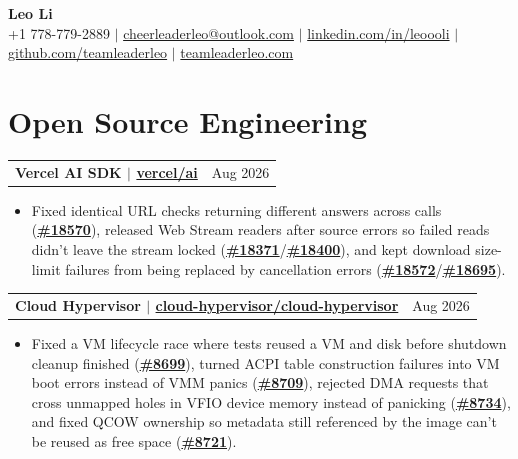 \documentclass[letterpaper,11pt]{article}
\makeatletter
\newcommand{\resumeHeadingSimple}[2]{%
  \begin{tabularx}{\textwidth}{@{}Xr@{}}
    \textbf{#1} & #2
  \end{tabularx}\vspace{-0.25pt}
}
\newcommand{\resumeItemListStart}{\begin{itemize}[leftmargin=0.23in,itemsep=1.2pt,parsep=0pt,topsep=1.0pt]}
\newcommand{\resumeItem}[1]{\item\fontsize{10.6pt}{12.2pt}\selectfont #1}
\newcommand{\resumeItemListEnd}{\end{itemize}\vspace{-0.25pt}}
\makeatother
\begin{document}
\begin{center}
  {\Huge\textbf{Leo Li}} \\[2pt]
  \small
  +1 778-779-2889 $|$
  \href{mailto:cheerleaderleo@outlook.com}{cheerleaderleo@outlook.com} $|$
  \href{https://www.linkedin.com/in/leoooli/}{linkedin.com/in/leoooli} $|$
  \href{https://github.com/teamleaderleo}{github.com/teamleaderleo} $|$
  \href{https://teamleaderleo.com/}{teamleaderleo.com}
\end{center}
\vspace{-10pt}

\section{Open Source Engineering}

\resumeHeadingSimple
  {Vercel AI SDK $|$ \href{https://redirect.github.com/vercel/ai}{vercel/ai}}
  {Aug 2026}
\resumeItemListStart
  \resumeItem{Fixed identical URL checks returning different answers across calls (\href{https://redirect.github.com/vercel/ai/pull/18570}{\textbf{\#18570}}), released Web Stream readers after source errors so failed reads didn't leave the stream locked (\href{https://redirect.github.com/vercel/ai/pull/18371}{\textbf{\#18371}}/\href{https://redirect.github.com/vercel/ai/pull/18400}{\textbf{\#18400}}), and kept download size-limit failures from being replaced by cancellation errors (\href{https://redirect.github.com/vercel/ai/pull/18572}{\textbf{\#18572}}/\href{https://redirect.github.com/vercel/ai/pull/18695}{\textbf{\#18695}}).}
\resumeItemListEnd

\resumeHeadingSimple
  {Cloud Hypervisor $|$ \href{https://redirect.github.com/cloud-hypervisor/cloud-hypervisor}{cloud-hypervisor/cloud-hypervisor}}
  {Aug 2026}
\resumeItemListStart
  \resumeItem{Fixed a VM lifecycle race where tests reused a VM and disk before shutdown cleanup finished (\href{https://redirect.github.com/cloud-hypervisor/cloud-hypervisor/pull/8699}{\textbf{\#8699}}), turned ACPI table construction failures into VM boot errors instead of VMM panics (\href{https://redirect.github.com/cloud-hypervisor/cloud-hypervisor/pull/8709}{\textbf{\#8709}}), rejected DMA requests that cross unmapped holes in VFIO device memory instead of panicking (\href{https://redirect.github.com/cloud-hypervisor/cloud-hypervisor/pull/8734}{\textbf{\#8734}}), and fixed QCOW ownership so metadata still referenced by the image can't be reused as free space (\href{https://redirect.github.com/cloud-hypervisor/cloud-hypervisor/pull/8721}{\textbf{\#8721}}).}
\resumeItemListEnd
\end{document}

